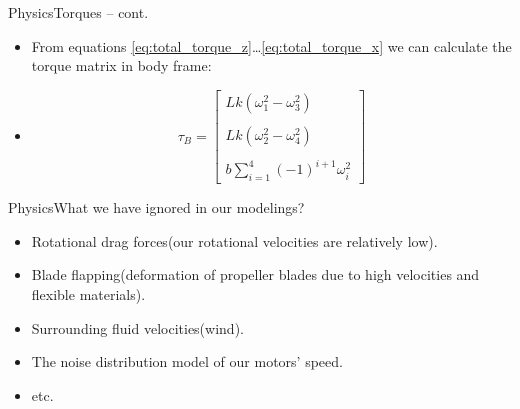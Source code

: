 \documentclass[8pt]{beamer}
\renewcommand{\|}[1][.3em]{\hspace{#1}|\hspace{#1}}
\renewcommand{\,}[1][.3em]{,\hspace{#1}}
\begin{document}
\begin{frame}{Physics}{Torques -- cont.}
    \begin{itemize}
    \item From equations \ref{eq:total_torque_z}\ldots\ref{eq:total_torque_x} we can calculate the torque matrix in body frame:
    \item[] \begin{equation}
    \tau_B = \begin{bmatrix}
    Lk(\omega_1^2 - \omega_3^2)\\\\
    Lk(\omega_2^2 - \omega_4^2)\\\\
    b\sum_{i=1}^4 (-1)^{i+1}\omega_i^2
    \end{bmatrix}
    \end{equation}
    \end{itemize}
\end{frame}

\begin{frame}{Physics}{What we have ignored in our modelings?}
    \begin{itemize}[<+->]
    \item Rotational drag forces(our rotational velocities are relatively low).
    \item Blade flapping(deformation of propeller blades due to high velocities and flexible materials).
    \item Surrounding fluid velocities(wind).
    \item The noise distribution model of our motors' speed.
    \item etc.
    \end{itemize}
\end{frame}
\end{document}
